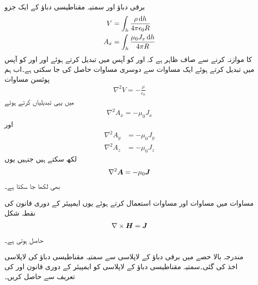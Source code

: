 برقی دباؤ اور سمتیہ مقناطیسی دباؤ کے ایک جزو
\begin{align*}
V&=\int_h \frac{\rho \dif h}{4\pi \epsilon_0 R}\\
A_x&=\int_h \frac{\mu_0 J_x \dif h}{4\pi R}
\end{align*}
 کا موازنہ کرنے سے صاف ظاہر ہے کہ  اور  کو آپس میں تبدیل کرتے ہوئے اور  اور  کو آپس میں تبدیل کرتے ہوئے ایک مساوات سے دوسری مساوات حاصل کی جا سکتی ہے۔اب ہم پوئسن  مساوات
\begin{align*}
\nabla^2 V=-\frac{\rho}{\epsilon_0}
\end{align*} 
میں یہی تبدیلیاں کرتے ہوئے
\begin{align*}
\nabla^2 A_x=-\mu_0 J_x
\end{align*}
اور
\begin{align*}
\nabla^2 A_y&=-\mu_0 J_y\\
\nabla^2 A_z&=-\mu_0 J_z
\end{align*}
لکھ سکتے ہیں جنہیں یوں
\begin{align}\label{مساوات_مقناطیسی_سمتی_مقناطیسی_دباو_کی_لاپلاسی}
\nabla^2 {{\boldsymbol{A}}}=-\mu_0 {{\boldsymbol{J}}}
\end{align}
 بھی لکھا جا سکتا ہے۔

مساوات  میں مساوات  اور مساوات  استعمال کرتے ہوئے یوں ایمپیئر کے دوری قانون کی نقطہ شکل 
\begin{align}
\nabla \times {\ensuremath{{\boldsymbol{H}}}}={{\boldsymbol{J}}}
\end{align}
حاصل ہوتی ہے۔

مندرجہ بالا حصے میں برقی دباؤ کے لاپلاسی سے سمتیہ مقناطیسی  دباؤ کی لاپلاسی اخذ کی گئی۔سمتیہ مقناطیسی دباؤ کے لاپلاسی کو ایمپیئر کے دوری قانون اور  کی تعریف سے حاصل کریں۔

